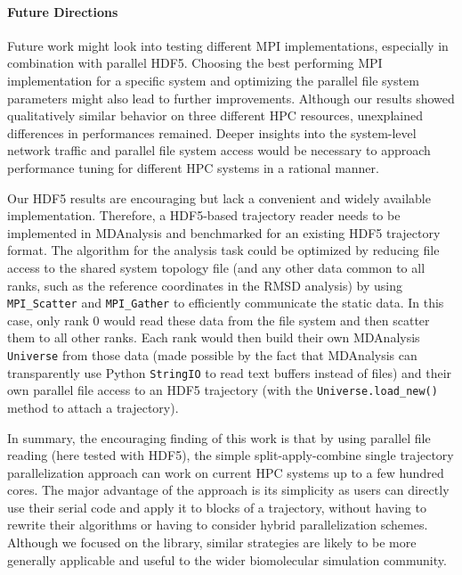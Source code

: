 \paragraph{Future Directions}

Future work might look into testing different MPI implementations, especially in combination with parallel HDF5.
Choosing the best performing MPI implementation for a specific system and optimizing the parallel file system parameters might also lead to further improvements.
Although our results showed qualitatively similar behavior on three different HPC resources, unexplained differences in performances remained.
Deeper insights into the system-level network traffic and parallel file system access would be necessary to approach performance tuning for different HPC systems in a rational manner.

Our HDF5 results are encouraging but lack a convenient and widely available implementation.
Therefore, a HDF5-based trajectory reader needs to be implemented in MDAnalysis and benchmarked for an existing HDF5 trajectory format.
The algorithm for the analysis task could be optimized by reducing file access to the shared system topology file (and any other data common to all ranks, such as the reference coordinates in the RMSD analysis) by using \texttt{MPI\_Scatter} and \texttt{MPI\_Gather} to efficiently communicate the static data.
In this case, only rank 0 would read these data from the file system and then scatter them to all other ranks.
Each rank would then build their own MDAnalysis \texttt{Universe} from those data (made possible by the fact that MDAnalysis can transparently use Python \texttt{StringIO} to read text buffers instead of files) and their own parallel file access to an HDF5 trajectory (with the \texttt{Universe.load\_new()} method to attach a trajectory).

In summary, the encouraging finding of this work is that by using parallel file reading (here tested with HDF5), the simple split-apply-combine single trajectory parallelization approach can work on current HPC systems up to a few hundred cores.
The major advantage of the approach is its simplicity as users can directly use their serial code and apply it to blocks of a trajectory, without having to rewrite their algorithms or having to consider hybrid parallelization schemes. 
Although we focused on the  library, similar strategies are likely to be more generally applicable and useful to the wider biomolecular simulation community.




